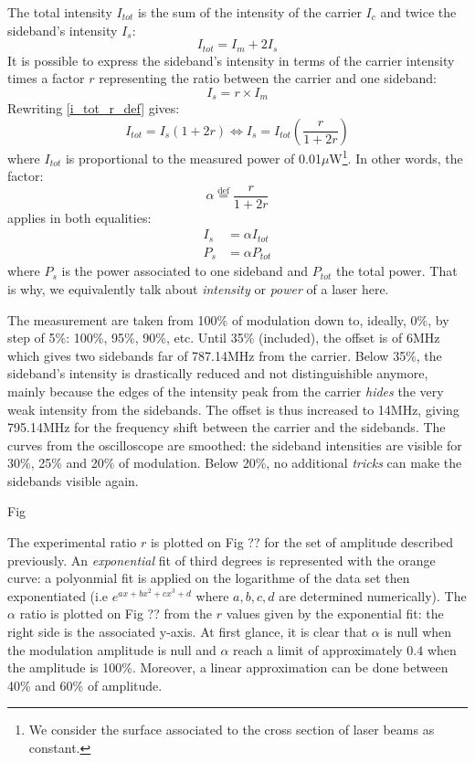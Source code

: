 \documentclass[12pt]{report}
\begin{document}
The total intensity $I_{tot}$ is the sum of the intensity of the carrier $I_c$ and twice the sideband's intensity $I_s$:
\begin{equation}
\label{i_tot_r_def}
I_{tot} = I_m + 2 I_s
\end{equation}
It is possible to express the sideband's intensity in terms of the carrier intensity times a factor $r$ representing the ratio between the carrier and one sideband:
\begin{equation}
I_s = r \times I_m
\end{equation}
Rewriting \eqref{i_tot_r_def} gives:
\begin{equation}
I_{tot} = I_s (1+2r) \Leftrightarrow I_s = I_{tot} \left( \frac{r}{1+2r} \right)
\end{equation}
where $I_{tot}$ is proportional to the measured power of 0.01$\mu$W\footnote{We consider the surface associated to the cross section of laser beams as constant.}. In other words, the factor:
\begin{equation}
\alpha \stackrel{\text{def}}{=} \frac{r}{1+2r}
\end{equation}
applies in both equalities:
\begin{align}
I_{s} &= \alpha I_{tot}\\
P_{s} &= \alpha P_{tot}
\end{align}
where $P_{s}$ is the power associated to one sideband and $P_{tot}$ the total power. That is why, we equivalently talk about \textit{intensity} or \textit{power} of a laser here.

The measurement are taken from 100\% of modulation down to, ideally, 0\%, by step of 5\%: 100\%, 95\%, 90\%, etc. Until 35\% (included), the offset is of 6MHz which gives two sidebands far of 787.14MHz from the carrier. Below 35\%, the sideband's intensity is drastically reduced and not distinguishible anymore, mainly because the edges of the intensity peak from the carrier \textit{hides} the very weak intensity from the sidebands. The offset is thus increased to 14MHz, giving 795.14MHz for the frequency shift between the carrier and the sidebands. The curves from the oscilloscope are smoothed: the sideband intensities are visible for 30\%, 25\% and 20\% of modulation. Below 20\%, no additional \textit{tricks} can make the sidebands visible again.

Fig

The experimental ratio $r$ is plotted on Fig ?? for the set of amplitude described previously. An \textit{exponential} fit of third degrees is represented with the orange curve: a polyonmial fit is applied on the logarithme of the data set then exponentiated (i.e $e^{ax+bx^2+cx^3+d}$ where $a,b,c,d$ are determined numerically). The $\alpha$ ratio is plotted on Fig ?? from the $r$ values given by the exponential fit: the right side is the associated y-axis. At first glance, it is clear that $\alpha$ is null when the modulation amplitude is null and $\alpha$ reach a limit of approximately $0.4$ when the amplitude is 100\%. Moreover, a linear approximation can be done between 40\% and 60\% of amplitude.
\end{document}
